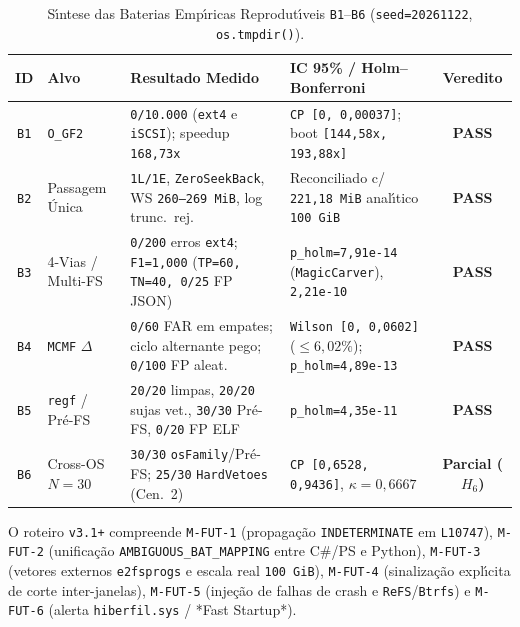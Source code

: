 \documentclass[10pt,twocolumn]{article}
\begin{document}
\begin{table}[t]
\centering
\caption{S\'{\i}ntese das Baterias Emp\'{\i}ricas Reprodut\'{\i}veis \texttt{B1}--\texttt{B6} (\texttt{seed=20261122}, \texttt{os.tmpdir()}).}
\footnotesize
\begin{tabularx}{\textwidth}{@{}c l Y Y c@{}}
\toprule
\textbf{ID} & \textbf{Alvo} & \textbf{Resultado Medido} & \textbf{IC 95\% / Holm--Bonferroni} & \textbf{Veredito} \\
\midrule
\texttt{B1} & \texttt{O\_GF2} & \texttt{0/10.000} (\texttt{ext4} e \texttt{iSCSI}); speedup \texttt{168,73x} & \texttt{CP [0, 0,00037]}; boot \texttt{[144,58x, 193,88x]} & \textbf{PASS} \\
\texttt{B2} & Passagem \'{U}nica & \texttt{1L/1E}, \texttt{ZeroSeekBack}, WS \texttt{260--269 MiB}, log trunc.\ rej. & Reconciliado c/ \texttt{221,18 MiB} anal\'{\i}tico \texttt{100 GiB} & \textbf{PASS} \\
\texttt{B3} & 4-Vias / Multi-FS & \texttt{0/200} erros \texttt{ext4}; \texttt{F1=1,000} (\texttt{TP=60, TN=40, 0/25} FP JSON) & \texttt{p\_holm=7,91e-14} (\texttt{MagicCarver}), \texttt{2,21e-10} & \textbf{PASS} \\
\texttt{B4} & \texttt{MCMF} $\Delta$ & \texttt{0/60} FAR em empates; ciclo alternante pego; \texttt{0/100} FP aleat. & \texttt{Wilson [0, 0,0602]} ($\le 6,02\%$); \texttt{p\_holm=4,89e-13} & \textbf{PASS} \\
\texttt{B5} & \texttt{regf} / Pr\'{e}-FS & \texttt{20/20} limpas, \texttt{20/20} sujas vet., \texttt{30/30} Pr\'{e}-FS, \texttt{0/20} FP ELF & \texttt{p\_holm=4,35e-11} & \textbf{PASS} \\
\texttt{B6} & Cross-OS $N=30$ & \texttt{30/30} \texttt{osFamily}/Pr\'{e}-FS; \texttt{25/30} \texttt{HardVetoes} (Cen.\ 2) & \texttt{CP [0,6528, 0,9436]}, $\kappa=0,6667$ & \textbf{Parcial ($H_6$)} \\
\bottomrule
\end{tabularx}
\end{table}

O roteiro \texttt{v3.1+} compreende \texttt{M-FUT-1} (propaga\c{c}\~{a}o \texttt{INDETERMINATE} em \texttt{L10747}), \texttt{M-FUT-2} (unifica\c{c}\~{a}o \texttt{AMBIGUOUS\_BAT\_MAPPING} entre C\#/PS e Python), \texttt{M-FUT-3} (vetores externos \texttt{e2fsprogs} e escala real \texttt{100 GiB}), \texttt{M-FUT-4} (sinaliza\c{c}\~{a}o expl\'{\i}cita de corte inter-janelas), \texttt{M-FUT-5} (inje\c{c}\~{a}o de falhas de crash e \texttt{ReFS}/\texttt{Btrfs}) e \texttt{M-FUT-6} (alerta \texttt{hiberfil.sys} / *Fast Startup*).
\end{document}
